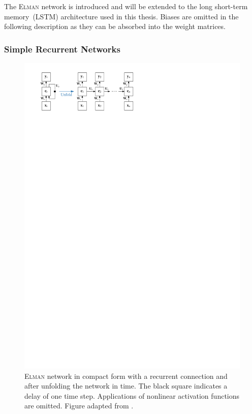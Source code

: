 The \textsc{Elman} network is introduced and will be extended to the long
short-term memory~(LSTM) architecture used in this thesis. Biases are omitted in
the following description as they can be absorbed into the weight matrices.

\subsubsection{Simple Recurrent Networks}
\label{sec:simple_recurrent_networks}
\begin{figure}[htb]
  \centering
  \includegraphics{./figures/theory/elman_rnn.pdf}
  \caption{\textsc{Elman} network in compact form with a recurrent connection
    and after unfolding the network in time. The black square indicates a delay
    of one time step. Applications of nonlinear activation functions are
    omitted. Figure adapted from \cite{lecun_bengio_hinton_DL}.}
  \label{fig:schematic_elman_rnn}
\end{figure}

